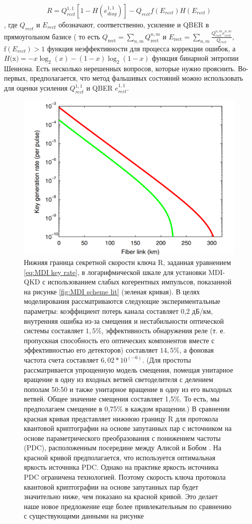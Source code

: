 \begin{align}
    R = Q_{rect}^{1,1}[1-H(e_{diag}^{1,1})] - Q_{rect}f(E_{rect})H(E_{rect})
\end{align} \label{eq:MDI key rate},
где $Q_{rect}$ и $E_{rect}$ обозначают, соответственно, усиление и QBER в прямоугольном базисе ( то есть $  Q_{\text{rect}} = \sum_{n,m} Q_{\text{rect}}^{n,m}  $ и $E_{\text{rect}} =\sum_{n,m} \frac{Q_{rect}^{n,m}e_{rect}^{n,m}}{Q_{rect}}$, $\text{f}(E_{rect}) > 1$ функция неэффективности для процесса коррекции ошибок, а $H\text{(x)} = - x\log_2(x) - (1 - x)\log_2(1-x) $  функция бинарной энтропии Шеннона. Есть несколько нерешенных вопросов, которые нужно прояснить. Во-первых, предполагается, что метод фальшивых состояний можно использовать для оценки усиления $Q_{rect}^{1,1}$ и QBER $e_{rect}^{1,1}$. 
\begin{figure}
    \centering
    \includegraphics[width=0.8\linewidth]{images/mdi speed.png}
    \caption{Нижняя граница секретной скорости ключа R, заданная уравнением \ref{eq:MDI key rate}, в логарифмической шкале для установки MDI-QKD с использованием слабых когерентных импульсов, показанной на рисунке \ref{fig:MDI scheme lit} (зеленая кривая). В целях моделирования рассматриваются следующие экспериментальные параметры: коэффициент потерь канала составляет 0,2 дБ/км, внутренняя ошибка из-за смещения и нестабильности оптической системы составляет $1,5\%$, эффективность обнаружения реле (т. е. пропускная способность его оптических компонентов вместе с эффективностью его детекторов) составляет $14,5\%$, а фоновая частота счета составляет $6,02 * 10^{(-6)}$. (Для простоты рассматривается упрощенную модель смещения, помещая унитарное вращение в одну из входных ветвей светоделителя с делением пополам 50:50 и также унитарное вращение в одну из его выходных ветвей. Общее значение смещения составляет 1,5\%. То есть, мы предполагаем смещение в 0,75\% в каждом вращении.) В сравнении красная кривая представляет нижнюю границу R для протокола квантовой криптографии на основе запутанных пар с источником на основе параметрического преобразования с понижением частоты (PDC), расположенным посередине между Алисой и Бобом \cite{ma2007}. На красной кривой предполагается, что используется оптимальная яркость источника PDC. Однако на практике яркость источника PDC ограничена технологией. Поэтому скорость ключа протокола квантовой криптографии на основе запутанных пар будет значительно ниже, чем показано на красной кривой. Это делает наше новое предложение еще более привлекательным по сравнению с существующими данными на рисунке}

\end{figure}
